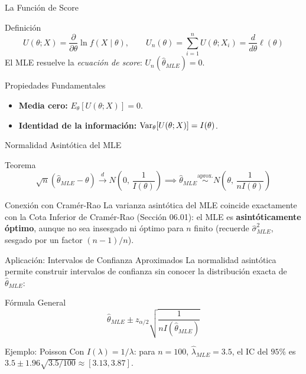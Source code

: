 \documentclass[10pt, aspectratio=169]{beamer}
\begin{document}
\begin{frame}{La Función de Score}
  \footnotesize
  \begin{block}{Definición}
    $$U(\theta;X) = \frac{\partial}{\partial\theta}\ln f(X\mid\theta), \qquad U_n(\theta) = \sum_{i=1}^n U(\theta;X_i) = \frac{d}{d\theta}\ell(\theta)$$
    El MLE resuelve la \emph{ecuación de score}: $U_n(\hat\theta_{MLE})=0$.
  \end{block}

  \vspace{0.1cm}
  \pause
  \begin{alertblock}{Propiedades Fundamentales}
    \begin{itemize}\itemsep=0.05cm
      \item \textbf{Media cero:} $E_\theta[U(\theta;X)]=0$.
      \item \textbf{Identidad de la información:} $\operatorname{Var}_\theta[U(\theta;X)] = I(\theta)$.
    \end{itemize}
  \end{alertblock}
\end{frame}

\begin{frame}{Normalidad Asintótica del MLE}
  \footnotesize
  \begin{block}{Teorema}
    $$\sqrt{n}(\hat\theta_{MLE}-\theta) \xrightarrow{d} N\!\left(0,\, \frac{1}{I(\theta)}\right) \implies \hat\theta_{MLE} \overset{\text{aprox.}}{\sim} N\!\left(\theta,\, \frac{1}{nI(\theta)}\right)$$
  \end{block}

  \vspace{0.1cm}
  \pause
  \begin{alertblock}{Conexión con Cramér-Rao}
    La varianza asintótica del MLE coincide exactamente con la Cota Inferior de Cramér-Rao (Sección 06.01): el MLE es \textbf{asintóticamente óptimo}, aunque no sea insesgado ni óptimo para $n$ finito (recuerde $\hat\sigma^2_{MLE}$, sesgado por un factor $(n-1)/n$).
  \end{alertblock}
\end{frame}

\begin{frame}{Aplicación: Intervalos de Confianza Aproximados}
  \footnotesize
  La normalidad asintótica permite construir intervalos de confianza sin conocer la distribución exacta de $\hat\theta_{MLE}$: \pause

  \vspace{0.1cm}
  \begin{block}{Fórmula General}
    $$\hat\theta_{MLE} \pm z_{\alpha/2}\sqrt{\dfrac{1}{n I(\hat\theta_{MLE})}}$$
  \end{block}

  \vspace{0.1cm}
  \pause
  \begin{alertblock}{Ejemplo: Poisson}
    Con $I(\lambda)=1/\lambda$: para $n=100$, $\hat\lambda_{MLE}=3.5$, el IC del $95\%$ es $3.5 \pm 1.96\sqrt{3.5/100} \approx [3.13, 3.87]$.
  \end{alertblock}
\end{frame}
\end{document}
